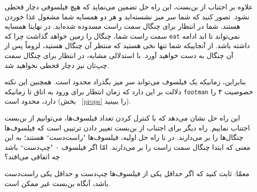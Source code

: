 \documentclass{book}
\begin{document}
    علاوه بر اجتناب از بن‌بست، این راه حل تضمین می‌نماید که هیچ فیلسوفی دچار قحطی نشود. 
    تصور کنید که شما سر میز نشسته‌اید و هر دو همسایه شما مشغول غذا خوردن هستند. 
    شما در انتظار برای چنگال سمت راست مسدوده شده‌اید. در نهایتا همسایه سمت راست شما، چنگال را زمین خواهد گذاشت چرا که  {\tt eat} 
    نمی‌تواند تا ابد ادامه داشته باشد. از آنجاییکه شما تنها نخی هستید که منتظر آن چنگال هستید، لزوماً پس از آن چنگال به دست خواهید آورد. 
    با استدلالی مشابه، در انتظار برای چنگال سمت چپ‌تان نیز دچار قحطی نخواهید شد. 
    
    بنابراین، زمانیکه یک فیلسوف می‌تواند سر میز بگذراد محدود است. همچنین این نکته دلالت بر این دارد که زمان انتظار برای ورود به اتاق 
    تا زمانیکه {\tt footman}  خصوصیت ۴ را دارد، محدود است (بخش ~\ref{props} را ببینید). 
     
    

    این راه حل نشان می‌دهد که با کنترل کردن تعداد فیلسوف‌ها، می‌توانیم از بن‌بست اجتناب نماییم. 
    راه دیگر برای اجتناب از بن‌بست تغییر دادن ترتیبی است  که فیلسوف‌ها چنگال‌ها را بر می‌دارند. 
    در نا راه حل اولیه، فیلسوف‌ها "راست‌دست``\LTRfootnote{} هستند؛ به این معنی که ابتدا چنگال سمت راست را بر می‌دارند. 
    امّا اگر فیلسوف ۰ "چپ‌دست``\LTRfootnote{} باشد چه اتفاقی می‌افتد؟‌

    معمّا: ثابت کنید که اگر حداقل یکی از فیلسوف‌ها چپ‌دست و حداقل یکی راست‌دست باشد، آنگاه بن‌بست غیر ممکن است. 
\end{document}
